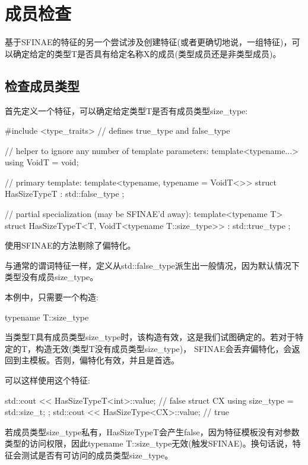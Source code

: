 \section{成员检查}

基于SFINAE的特征的另一个尝试涉及创建特征(或者更确切地说，一组特征)，可以确定给定的类型T是否具有给定名称X的成员(类型成员还是非类型成员)。

\subsection{检查成员类型}

首先定义一个特征，可以确定给定类型T是否有成员类型size\_type:

\begin{cpp}
#include <type_traits> // defines true_type and false_type

// helper to ignore any number of template parameters:
template<typename...> using VoidT = void;

// primary template:
template<typename, typename = VoidT<>>
struct HasSizeTypeT : std::false_type
{
};

// partial specialization (may be SFINAE’d away):
template<typename T>
struct HasSizeTypeT<T, VoidT<typename T::size_type>> : std::true_type
{
};
\end{cpp}

使用SFINAE的方法剔除了偏特化。

与通常的谓词特征一样，定义从std::false\_type派生出一般情况，因为默认情况下类型没有成员size\_type。

本例中，只需要一个构造:

\begin{cpp}
typename T::size_type
\end{cpp}

当类型T具有成员类型size\_type时，该构造有效，这是我们试图确定的。若对于特定的T，构造无效(类型T没有成员类型size\_type)， SFINAE会丢弃偏特化，会返回到主模板。否则，偏特化有效，并且是首选。

可以这样使用这个特征:

\begin{cpp}
std::cout << HasSizeTypeT<int>::value; // false
struct CX {
	using size_type = std::size_t;
};
std::cout << HasSizeType<CX>::value; // true
\end{cpp}

若成员类型size\_type私有，HasSizeTypeT会产生false，因为特征模板没有对参数类型的访问权限，因此typename T::size\_type无效(触发SFINAE)。换句话说，特征会测试是否有可访问的成员类型size\_type。

